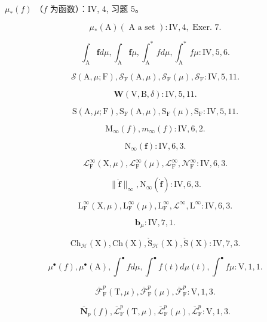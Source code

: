 \(\mu_{*}(f)\) （\(f\) 为函数）：IV, 4, 习题 5。

\[
\mu_ {*} (\mathrm{A}) (\text { A a set }): \mathrm{IV}, 4, \text { Exer. } 7.
\]

\[
\int_ {\mathrm{A}} \textbf {f} d \mu , \int_ {\mathrm{A}} \textbf {f} \mu , \int_ {\mathrm{A}} ^ {*} f d \mu , \int_ {\mathrm{A}} ^ {*} f \mu : \mathrm{IV}, 5, 6.
\]

\[
\mathcal {S} (\mathrm{A}, \mu ; \mathrm{F}), \mathcal {S} _ {\mathrm{F}} (\mathrm{A}, \mu), \mathcal {S} _ {\mathrm{F}} (\mu), \mathcal {S} _ {\mathrm{F}}: \mathrm{IV}, 5, 11.
\]

\[
\boldsymbol {W} (\mathrm{V}, \mathrm{B}, \delta): \mathrm{IV}, 5, 11.
\]

\[
\mathrm{S} (\mathrm{A}, \mu ; \mathrm{F}), \mathrm{S} _ {\mathrm{F}} (\mathrm{A}, \mu), \mathrm{S} _ {\mathrm{F}} (\mu), \mathrm{S} _ {\mathrm{F}}: \mathrm{IV}, 5, 11.
\]

\[
\mathrm{M} _ {\infty} (f), m _ {\infty} (f): \mathrm{IV}, 6, 2.
\]

\[
\mathrm{N} _ {\infty} (\mathbf {f}): \mathrm{IV}, 6, 3.
\]

\[
\mathcal {L} _ {\mathrm{F}} ^ {\infty} (\mathrm{X}, \mu), \mathcal {L} _ {\mathrm{F}} ^ {\infty} (\mu), \mathcal {L} _ {\mathrm{F}} ^ {\infty}, \mathcal {N} _ {\mathrm{F}} ^ {\infty}: \mathrm{IV}, 6, 3.
\]

\[
\| \dot {\mathbf {f}} \| _ {\infty}, \mathrm{N} _ {\infty} (\dot {\mathbf {f}}): \mathrm{IV}, 6, 3.
\]

\[
\mathrm{L} _ {\mathrm{F}} ^ {\infty} (\mathrm{X}, \mu), \mathrm{L} _ {\mathrm{F}} ^ {\infty} (\mu), \mathrm{L} _ {\mathrm{F}} ^ {\infty}, \mathcal {L} ^ {\infty}, \mathrm{L} ^ {\infty}: \mathrm{IV}, 6, 3.
\]

\[
\mathbf {b} _ {\mu}: \mathrm{IV}, 7, 1.
\]

\[
\mathrm{Ch} _ {\mathcal {H}} (\mathrm{X}), \mathrm{Ch} (\mathrm{X}), \check {\mathrm{S}} _ {\mathcal {H}} (\mathrm{X}), \check {\mathrm{S}} (\mathrm{X}): \mathrm{IV}, 7, 3.
\]

\[
\mu^ {\bullet} (f), \mu^ {\bullet} (\mathrm{A}), \int^ {\bullet} f d \mu , \int^ {\bullet} f (t) d \mu (t), \int^ {\bullet} f \mu : \mathrm{V}, 1, 1.
\]

\[
\overline {{\mathcal {F}}} _ {\mathrm{F}} ^ {p} (\mathrm{T}, \mu), \overline {{\mathcal {F}}} _ {\mathrm{F}} ^ {p} (\mu), \overline {{\mathcal {F}}} _ {\mathrm{F}} ^ {p}: \mathrm{V}, 1, 3.
\]

\[
\overline {{\mathbf {N}}} _ {p} (f), \overline {{\mathcal {L}}} _ {\mathrm{F}} ^ {p} (\mathrm{T}, \mu), \overline {{\mathcal {L}}} _ {\mathrm{F}} ^ {p} (\mu), \overline {{\mathcal {L}}} _ {\mathrm{F}} ^ {p}: \mathrm{V}, 1, 3.
\]

